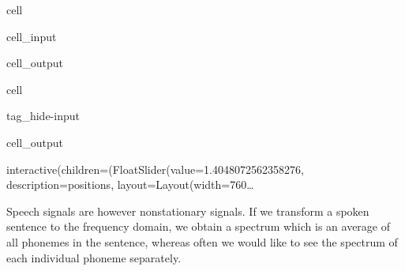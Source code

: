 \documentclass[letterpaper,10pt,english]{jupyterBook}
\begin{document}
\begin{sphinxuseclass}{cell}
\begin{sphinxVerbatimInput}
\begin{sphinxuseclass}{cell_input}
\begin{sphinxVerbatim}[commandchars=\\\{\}]
\end{sphinxVerbatim}

\end{sphinxuseclass}\end{sphinxVerbatimInput}
\begin{sphinxVerbatimOutput}

\begin{sphinxuseclass}{cell_output}
\noindent{}

\noindent{}

\noindent{}

\noindent{}

\end{sphinxuseclass}\end{sphinxVerbatimOutput}

\end{sphinxuseclass}
\begin{sphinxuseclass}{cell}
\begin{sphinxuseclass}{tag_hide-input}\begin{sphinxVerbatimOutput}

\begin{sphinxuseclass}{cell_output}
\begin{sphinxVerbatim}[commandchars=\\\{\}]
interactive(children=(FloatSlider(value=1.4048072562358276, description=\PYGZsq{}position\PYGZus{}s\PYGZsq{}, layout=Layout(width=\PYGZsq{}760…
\end{sphinxVerbatim}

\end{sphinxuseclass}\end{sphinxVerbatimOutput}

\end{sphinxuseclass}
\end{sphinxuseclass}
\sphinxAtStartPar
Speech signals are however non\sphinxhyphen{}stationary signals. If we transform a
spoken sentence to the frequency domain, we obtain a spectrum which is
an average of all phonemes in the sentence, whereas often we would like
to see the spectrum of each individual phoneme separately.
\end{document}
